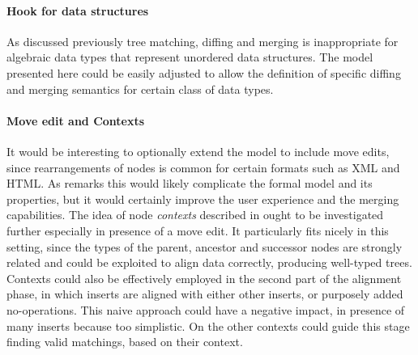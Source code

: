 \documentclass[../Thesis.tex]{subfiles}
\begin{document}
	\paragraph{Hook for data structures}
	As discussed previously tree matching, diffing and merging is
	inappropriate for algebraic data types that represent unordered data 
	structures. The model presented here could be easily adjusted
	to allow the definition of specific diffing and merging semantics 
	for certain class of data types.
	
	\paragraph{Move edit and Contexts}	
	It would be interesting to optionally extend the model to include move
	edits, since rearrangements of nodes is common for certain formats
	such as XML and HTML. As \cite{Ramsey01} remarks this would 
	likely complicate the formal model and its properties, but it 
	would certainly improve the user experience and the merging
	capabilities.
	The idea of node \emph{contexts} described in \cite{Lind01} ought
	to be investigated further especially in presence of a move edit. 
	It particularly fits nicely in this setting, since
	the types of the parent, ancestor and successor nodes are strongly
	related and could be exploited to align data correctly, producing 
	well-typed trees.
	Contexts could also be effectively employed in the second part of the
	alignment phase, in which inserts are aligned with either other inserts,
	or purposely added no-operations.
	This naive approach could have a negative impact, 
	in presence of many inserts because too simplistic. On the other contexts
	could guide this stage finding valid matchings, based on their context. 
		
	
 	
		
\end{document}

